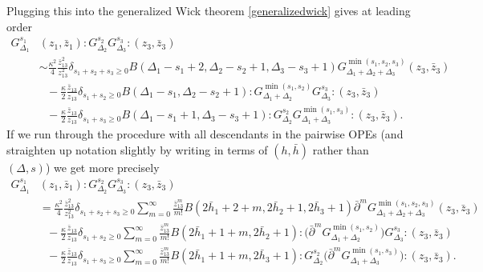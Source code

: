 \documentclass[11pt,letterpaper]{article}
\begin{document}
Plugging this into the generalized Wick theorem \eqref{generalizedwick} gives at leading order \begin{equation} \label{boundary-graviton-holomorphic-leading}
\begin{split}
G_{\Delta_1}^{s_1}& (z_1,  \bar{z}_1) :G_{\Delta_2}^{s_2} G_{\Delta_3}^{s_3}:(z_3, \bar{z}_3)\\   
& \sim \frac{\kappa^2}{4} \frac{\bar{z}_{13}^2}{z_{13}^2}\delta_{s_1 + s_2 +s_3 \geq 0} B(\Delta_1 - s_1 + 2, \Delta_2 - s_2 + 1, \Delta_3 - s_3 + 1) G_{\Delta_1 + \Delta_2 + \Delta_3}^{ \min( s_1, s_2, s_3)  }(z_3, \bar{z}_3) \\
\ & \ \ \ - \frac{\kappa}{2} \frac{\bar{z}_{13}}{z_{13}} \delta_{s_1 + s_2 \geq 0} B(\Delta_1 - s_1, \Delta_2 - s_2 + 1) : G^{ \min(s_1, s_2) } _{\Delta_1 + \Delta_2} G_{\Delta_3}^{s_3}: (z_3, \bar{z}_3)  \\
\ & \ \ \ - \frac{\kappa}{2} \frac{\bar{z}_{13}}{z_{13}}   \delta_{s_1 + s_3 \geq 0} B(\Delta_1 - s_1 + 1, \Delta_3 - s_3 + 1) :G_{\Delta_2}^{s_2} G^{ \min(s_1, s_3) }_{\Delta_1 + \Delta_3}:(z_3, \bar{z}_3).
\end{split}
\end{equation}
If we run through the procedure with all descendants in the pairwise OPEs (and straighten up notation slightly by writing in terms of $(h, \bar{h})$ rather than $(\Delta, s)$) we get more precisely \begin{equation} \label{boundary-graviton-holomorphic}
\begin{split}
G_{\Delta_1}^{s_1}& (z_1,  \bar{z}_1) :G_{\Delta_2}^{s_2} G_{\Delta_3}^{s_3}:(z_3, \bar{z}_3)\\   
& = \frac{\kappa^2}{4} \frac{\bar{z}_{13}^2}{z_{13}^2}\delta_{s_1 + s_2 +s_3 \geq 0}  \sum_{m=0}^\infty \frac{\bar{z}_{13}^m}{m!}B(2 \bar{h}_1 + 2+m, 2 \bar{h}_2 + 1, 2 \bar{h}_3 + 1) \bar{\partial}^mG_{\Delta_1 + \Delta_2 + \Delta_3}^{ \min( s_1, s_2, s_3)  }(z_3, \bar{z}_3) \\
\ & \ \ \ - \frac{\kappa}{2} \frac{\bar{z}_{13}}{z_{13}} \delta_{s_1 + s_2 \geq 0} \sum_{m=0}^\infty \frac{\bar{z}_{13}^m}{m!} B(2 \bar{h}_1 + 1+m, 2 \bar{h}_2 + 1) :\Big(\bar{\partial}^m G^{ \min(s_1, s_2) } _{\Delta_1 + \Delta_2} \Big) G_{\Delta_3}^{s_3}: (z_3, \bar{z}_3)  \\
\ & \ \ \ - \frac{\kappa}{2} \frac{\bar{z}_{13}}{z_{13}}   \delta_{s_1 + s_3 \geq 0}\sum_{m=0}^\infty \frac{\bar{z}_{13}^m}{m!}B(2 \bar{h}_1 + 1+m, 2 \bar{h}_3 + 1) :G_{\Delta_2}^{s_2} \Big(\bar{\partial}^m G^{ \min(s_1, s_3) }_{\Delta_1 + \Delta_3}\Big):(z_3, \bar{z}_3).
\end{split}
\end{equation}
\end{document}
